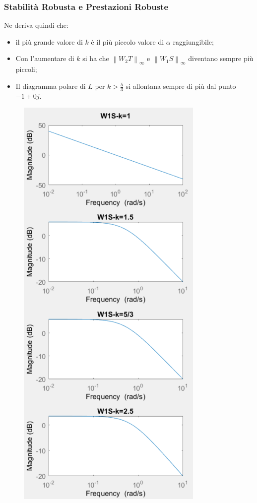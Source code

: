 \documentclass{beamer}
\begin{document}
\begin{frame}
\frametitle{Stabilità Robusta e Prestazioni Robuste}
\begin{minipage}{0.33\textwidth}
	Ne deriva quindi che:\begin{itemize}
		\item il più grande valore di \(k \) è il più piccolo valore di \(\alpha \) raggiungibile;
		\item Con l'aumentare di \(k \) si ha che \(\left\lVert W_{2}T\right\rVert_{\infty}\) e \(\left\lVert W_{1}S\right\rVert_{\infty} \) diventano sempre più piccoli;
		\item Il diagramma polare di \(L \) per \(k>\frac{5}{3}\) si allontana sempre di più dal punto \(-1+0j \).
	\end{itemize}
\end{minipage}
\begin{minipage}{0.66\textwidth}
\begin{figure}
	\centering
		\begin{minipage}{0.49\textwidth}
			{\includegraphics[scale=0.3]{2022-06-09-17-38-00.png}}%

\end{minipage}
\end{figure}
\end{minipage}
\end{frame}
\end{document}
